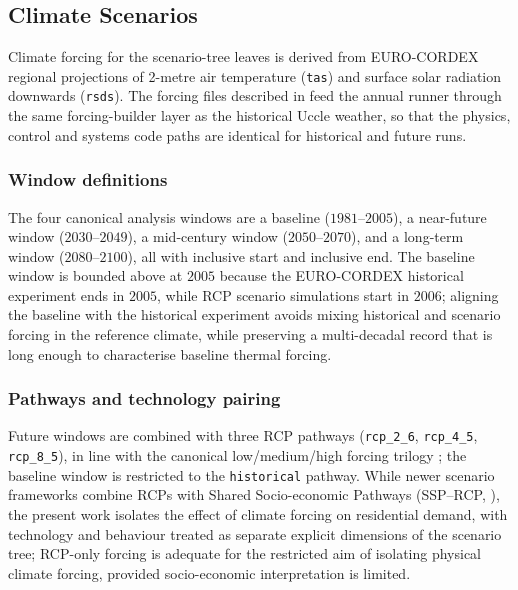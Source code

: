\subsection{Climate Scenarios}
\label{sec:climateScenariosFramework}

Climate forcing for the scenario-tree leaves is derived from EURO-CORDEX \cite{Jacob2014EuroCordex} regional projections of 2-metre air temperature (\texttt{tas}) and surface solar radiation downwards (\texttt{rsds}). The forcing files described in  feed the annual runner through the same forcing-builder layer as the historical Uccle weather, so that the physics, control and systems code paths are identical for historical and future runs.

\subsubsection*{Window definitions} 
The four canonical analysis windows are a baseline ($1981$--$2005$), a near-future window ($2030$--$2049$), a mid-century window ($2050$--$2070$), and a long-term window ($2080$--$2100$), all with inclusive start and inclusive end. The baseline window is bounded above at $2005$ because the EURO-CORDEX historical experiment ends in $2005$, while RCP scenario simulations start in $2006$; aligning the baseline with the historical experiment avoids mixing historical and scenario forcing in the reference climate, while preserving a multi-decadal record that is long enough to characterise baseline thermal forcing. 

\subsubsection*{Pathways and technology pairing} 
Future windows are combined with three RCP pathways (\texttt{rcp\_2\_6}, \texttt{rcp\_4\_5}, \texttt{rcp\_8\_5}), in line with the canonical low/medium/high forcing trilogy \cite{vanVuuren2011}; the baseline window is restricted to the \texttt{historical} pathway. While newer scenario frameworks combine RCPs with Shared Socio-economic Pathways (SSP--RCP, \cite{Riahi2017SSP}), the present work isolates the effect of climate forcing on residential demand, with technology and behaviour treated as separate explicit dimensions of the scenario tree; RCP-only forcing is adequate for the restricted aim of isolating physical climate forcing, provided socio-economic interpretation is limited.

